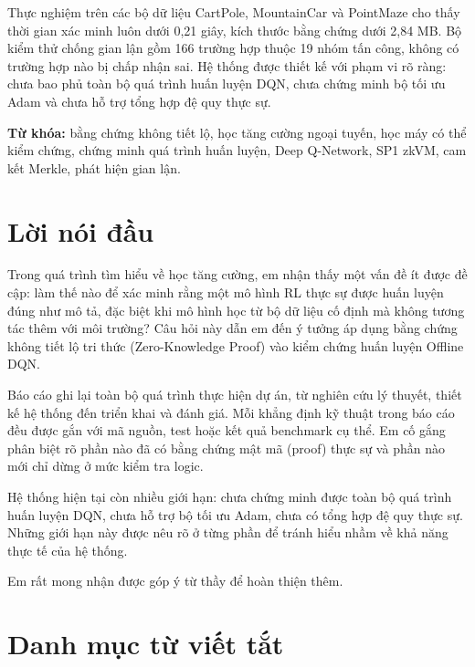 \documentclass[12pt,a4paper,oneside]{report}
\begin{document}
Thực nghiệm trên các bộ dữ liệu CartPole, MountainCar và PointMaze cho thấy thời gian xác minh luôn dưới 0,21 giây, kích thước bằng chứng dưới 2,84 MB. Bộ kiểm thử chống gian lận gồm 166 trường hợp thuộc 19 nhóm tấn công, không có trường hợp nào bị chấp nhận sai. Hệ thống được thiết kế với phạm vi rõ ràng: chưa bao phủ toàn bộ quá trình huấn luyện DQN, chưa chứng minh bộ tối ưu Adam và chưa hỗ trợ tổng hợp đệ quy thực sự.

\noindent\textbf{Từ khóa:} bằng chứng không tiết lộ, học tăng cường ngoại tuyến, học máy có thể kiểm chứng, chứng minh quá trình huấn luyện, Deep Q-Network, SP1 zkVM, cam kết Merkle, phát hiện gian lận.

\clearpage

\chapter*{Lời nói đầu}

Trong quá trình tìm hiểu về học tăng cường, em nhận thấy một vấn đề ít được đề cập: làm thế nào để xác minh rằng một mô hình RL thực sự được huấn luyện đúng như mô tả, đặc biệt khi mô hình học từ bộ dữ liệu cố định mà không tương tác thêm với môi trường? Câu hỏi này dẫn em đến ý tưởng áp dụng bằng chứng không tiết lộ tri thức (Zero-Knowledge Proof) vào kiểm chứng huấn luyện Offline DQN.

Báo cáo ghi lại toàn bộ quá trình thực hiện dự án, từ nghiên cứu lý thuyết, thiết kế hệ thống đến triển khai và đánh giá. Mỗi khẳng định kỹ thuật trong báo cáo đều được gắn với mã nguồn, test hoặc kết quả benchmark cụ thể. Em cố gắng phân biệt rõ phần nào đã có bằng chứng mật mã (proof) thực sự và phần nào mới chỉ dừng ở mức kiểm tra logic.

Hệ thống hiện tại còn nhiều giới hạn: chưa chứng minh được toàn bộ quá trình huấn luyện DQN, chưa hỗ trợ bộ tối ưu Adam, chưa có tổng hợp đệ quy thực sự. Những giới hạn này được nêu rõ ở từng phần để tránh hiểu nhầm về khả năng thực tế của hệ thống.

Em rất mong nhận được góp ý từ thầy để hoàn thiện thêm.

\clearpage

\tableofcontents
\clearpage

\listoftables
\clearpage

\listoffigures
\clearpage

\chapter*{Danh mục từ viết tắt}
\end{document}
